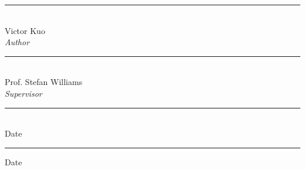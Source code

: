 \begin{declaration}
\vspace{0.5cm}

\vfill
\begin{center}
    \begin{minipage}[t]{0.4\textwidth}
        \begin{flushleft}
            \rule{\textwidth}{0.5pt}\\
            Victor Kuo\\
            \emph{Author}
            \\[1.5cm]
            \rule{\textwidth}{0.5pt}\\
            Prof. Stefan Williams\\
            \emph{Supervisor}
        \end{flushleft}
    \end{minipage}
    \hspace{1cm}
    \begin{minipage}[t]{0.4\textwidth}
        \begin{flushleft}
            \rule{\textwidth}{0.5pt}\\
            Date
            \\[2.15cm]
            \rule{\textwidth}{0.5pt}
            Date
        \end{flushleft}
    \end{minipage}
\end{center}


\end{declaration}
\restoregeometry
